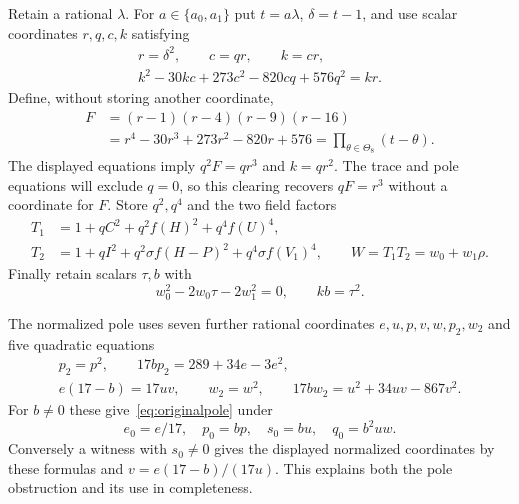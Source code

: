 \documentclass[11pt,a4paper]{article}
\begin{document}
Retain a rational $\lambda$. For $a\in\{a_0,a_1\}$ put $t=a\lambda$,
$\delta=t-1$, and use scalar coordinates $r,q,c,k$ satisfying
\begin{equation}\label{eq:contactcircuit}
 \begin{gathered}
 r=\delta^2,\qquad c=qr,\qquad k=cr,\\
 k^2-30kc+273c^2-820cq+576q^2=kr.
 \end{gathered}
\end{equation}
Define, without storing another coordinate,
\[
 \begin{split}
 F&=(r-1)(r-4)(r-9)(r-16)\\
  &=r^4-30r^3+273r^2-820r+576
    =\prod_{\theta\in\Theta_8}(t-\theta).
 \end{split}
\]
The displayed equations imply $q^2F=qr^3$ and $k=qr^2$.
The trace and pole equations will exclude $q=0$, so this clearing
recovers $qF=r^3$ without a coordinate for $F$.
Store $q^2,q^4$ and the two field factors
\begin{equation}\label{eq:packed}
 \begin{split}
 T_1&=1+qC^2+q^2f(H)^2+q^4f(U)^4,\\
 T_2&=1+qI^2+q^2\sigma f(H-P)^2+q^4\sigma f(V_1)^4,
 \qquad W=T_1T_2=w_0+w_1\rho.
 \end{split}
\end{equation}
Finally retain scalars $\tau,b$ with
\begin{equation}\label{eq:trace}
             w_0^2-2w_0\tau-2w_1^2=0,\qquad
             kb=\tau^2.
\end{equation}

The normalized pole uses seven further rational coordinates
$e,u,p,v,w,p_2,w_2$ and five quadratic equations
\begin{equation}\label{eq:normalizedpole}
 \begin{gathered}
 p_2=p^2,\qquad 17bp_2=289+34e-3e^2,\\
 e(17-b)=17uv,\qquad w_2=w^2,\qquad
 17bw_2=u^2+34uv-867v^2.
 \end{gathered}
\end{equation}
For $b\ne0$ these give~\eqref{eq:originalpole} under
\[
 e_0=e/17,\quad p_0=bp,\quad s_0=bu,\quad q_0=b^2uw.
\]
Conversely a witness with $s_0\ne0$ gives the displayed normalized
coordinates by these formulas and $v=e(17-b)/(17u)$.
This explains both the pole obstruction and its use in completeness.
\end{document}
